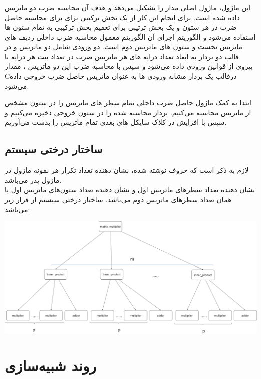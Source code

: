 \documentclass[12pt,titlepage,a4page , tikz , multi,table , svgnames,xcdraw]{article}
\begin{document}
\subsubsection{}
این ماژول، ماژول اصلی مدار را تشکیل می‌دهد و هدف آن محاسبه ضرب دو ماتریس داده شده است.
برای انجام این کار از یک بخش ترکیبی برای برای محاسبه حاصل ضرب در هر ستون و یک بخش ترتیبی برای تعمیم بخش ترکیبی به تمام ستون ها استفاده می‌شود و الگوریتم اجرای آن الگوریتم معمول محاسبه ضرب داخلی ردیف های ماتریس نخست و ستون های ماتریس دوم است.
 دو ورودی شامل دو ماتریس 
  و 
  در قالب دو بردار به ابعاد تعداد درایه های هر ماتریس ضرب در تعداد بیت هر درایه با پیروی از قوانین 
  ورودی داده می‌شود و سپس با محاسبه ضرب این دو ماتریس ، مقدار Cدرقالب یک بردار مشابه ورودی ها به عنوان ماتریس حاصل ضرب خروجی داده می‌شود.

ابتدا به کمک ماژول 
حاصل ضرب داخلی تمام سطر های ماتریس 
 را در ستون مشخص 
 از ماتریس 
 محاسبه می‌کنیم. بردار محاسبه شده را در ستون 
 خروجی 
 ذخیره می‌کنیم و سپس با افزایش 
 در کلاک سایکل های بعدی تمام ماتریس 
 را بدست می‌آوریم.

\subsection{ساختار درختی سیستم}
لازم به ذکر است که حروف نوشته شده، نشان دهنده تعداد تکرار هر نمونه ماژول در ماژول پدر می‌باشد. \\ 
 نشان دهنده تعداد سطرهای ماتریس اول و 
 نشان دهنده تعداد ستون‌های ماتریس اول یا همان تعداد سطرهای ماتریس دوم می‌باشد. ساختار درختی سیستم از قرار زیر می‌باشد:
\begin{center}
\includegraphics[scale=0.2]
    {Images/System Architecture/DSD_Project_hierarchy.png}\\
\end{center}

\newpage
\section{روند شبیه‌سازی}
\end{document}
